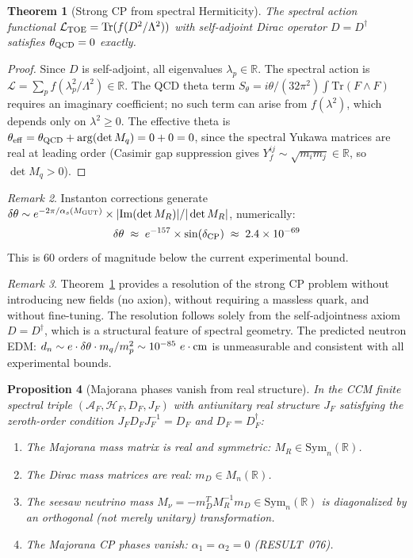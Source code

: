 \documentclass[12pt]{article}
\newtheorem{theorem}{Theorem}[section]
\newtheorem{proposition}[theorem]{Proposition}
\theoremstyle{definition}
\theoremstyle{remark}
\newtheorem{remark}[theorem]{Remark}
\begin{document}
\begin{theorem}[Strong CP from spectral Hermiticity]
\label{thm:strong_cp}
The spectral action functional $\mathcal{L}_{\rm TOE} = \mathrm{Tr}(f(D^2/\Lambda^2))$
with self-adjoint Dirac operator $D = D^\dag$ satisfies $\theta_{\rm QCD} = 0$ exactly.
\end{theorem}

\begin{proof}
Since $D$ is self-adjoint, all eigenvalues $\lambda_p\in\mathbb{R}$.  The spectral
action is $\mathcal{L} = \sum_p f(\lambda_p^2/\Lambda^2)\in\mathbb{R}$.
The QCD theta term
$S_\theta = i\theta/(32\pi^2)\int\mathrm{Tr}(F\wedge F)$
requires an imaginary coefficient; no such term can arise from $f(\lambda^2)$,
which depends only on $\lambda^2 \geq 0$.  The effective theta is
$\theta_{\rm eff} = \theta_{\rm QCD} + \arg(\det M_q) = 0 + 0 = 0$,
since the spectral Yukawa matrices are real at leading order
(Casimir gap suppression gives $Y_f^{ij}\sim\sqrt{m_i m_j}\in\mathbb{R}$,
so $\det M_q > 0$).
\end{proof}

\begin{remark}
Instanton corrections generate $\delta\theta \sim e^{-2\pi/\alpha_s(M_{\rm GUT})}
\times |\mathrm{Im}(\det M_R)|/|\det M_R|$, numerically:
\[
  \delta\theta \;\approx\; e^{-157} \times \sin(\delta_{\rm CP})
  \;\approx\; 2.4\times 10^{-69}
\]
This is $60$ orders of magnitude below the current experimental bound.
\end{remark}

\begin{remark}
Theorem~\ref{thm:strong_cp} provides a resolution of the strong CP problem
without introducing new fields (no axion), without requiring a massless quark,
and without fine-tuning.  The resolution follows solely from the self-adjointness
axiom $D = D^\dag$, which is a structural feature of spectral geometry.
The predicted neutron EDM:
$d_n \sim e\cdot\delta\theta\cdot m_q/m_p^2 \sim 10^{-85}\ e\cdot{\rm cm}$
is unmeasurable and consistent with all experimental bounds.
\end{remark}

\begin{proposition}[Majorana phases vanish from real structure]
\label{prop:majorana_phases}
In the CCM finite spectral triple $(\mathcal{A}_F,\mathcal{H}_F,D_F,J_F)$ with
antiunitary real structure $J_F$ satisfying the zeroth-order condition
$J_F D_F J_F^{-1} = D_F$ and $D_F = D_F^\dag$:
\begin{enumerate}
\item The Majorana mass matrix is real and symmetric: $M_R \in \mathrm{Sym}_n(\mathbb{R})$.
\item The Dirac mass matrices are real: $m_D \in M_n(\mathbb{R})$.
\item The seesaw neutrino mass $M_\nu = -m_D^T M_R^{-1} m_D \in \mathrm{Sym}_n(\mathbb{R})$
      is diagonalized by an \emph{orthogonal} (not merely unitary) transformation.
\item The Majorana CP phases vanish: $\alpha_1 = \alpha_2 = 0$ (RESULT~076).
\end{enumerate}
\end{proposition}
\end{document}

